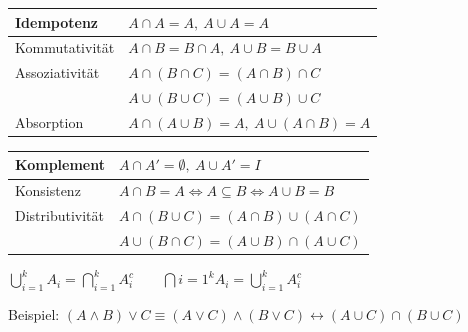 \documentclass[a4paper]{article}
\begin{document}
	\begin{fmerke}
		\begin{multicols}{2}
		\renewcommand{\arraystretch}{1.2}
		\begin{tabular}{l|l}
		Idempotenz &
		$A \cap A = A,\: A \cup A = A$\\
		\hline Kommutativität &
		$A \cap B = B \cap A,\: A \cup B = B\cup A$\\
		\hline Assoziativität &
		$A \cap (B \cap C) = (A \cap B) \cap C$\\
		& $A \cup (B \cup C) = (A \cup B) \cup C$\\
		\hline Absorption &
		$A\cap (A \cup B)=A,\: A \cup (A\cap B)=A$
		\end{tabular}
		\begin{tabular}{l|l}
		Komplement &
		$A \cap A'=\emptyset,\: A \cup A'=I$\\
		\hline Konsistenz &
		$A \cap B = A \Leftrightarrow A \subseteq B \Leftrightarrow A \cup B = B$\\
		\hline Distributivität &
		$A \cap (B\cup C) = (A\cap B) \cup (A \cap C)$\\
		& $A \cup (B\cap C) = (A\cup B) \cap (A \cup C)$
		\end{tabular}
		\end{multicols}
		\vspace{-2mm}
	\end{fmerke}


\begin{multicols}{2}
	\begin{fsatz}[de Morgan]
		$\bigcup_{i=1}^k A_i = \bigcap_{i=1}^k A_i^c \quad \quad \bigcap{i=1}^k A_i = \bigcup_{i=1}^k A_i^c$
	\end{fsatz}
	Beispiel: $(A \wedge B) \vee C \equiv (A \vee C) \wedge (B \vee C) \leftrightarrow (A \cup C) \cap (B \cup C)$
\end{multicols}
\end{document}

